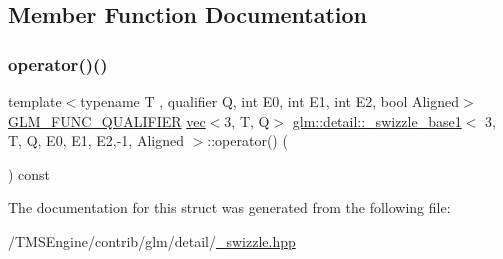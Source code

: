 \subsection{Member Function Documentation}
\mbox{\label{structglm_1_1detail_1_1__swizzle__base1_3_013_00_01_t_00_01_q_00_01_e0_00_01_e1_00_01_e2_00-1_00_01_aligned_01_4_a52562036288d3f7a063c5172f4b572ab}} 
\subsubsection{\texorpdfstring{operator()()}{operator()()}}
{\footnotesize\ttfamily template$<$typename T , qualifier Q, int E0, int E1, int E2, bool Aligned$>$ \\
\hyperlink{setup_8hpp_a33fdea6f91c5f834105f7415e2a64407}{G\+L\+M\+\_\+\+F\+U\+N\+C\+\_\+\+Q\+U\+A\+L\+I\+F\+I\+ER} \hyperlink{structglm_1_1vec}{vec}$<$3, T, Q$>$ \hyperlink{structglm_1_1detail_1_1__swizzle__base1}{glm\+::detail\+::\+\_\+swizzle\+\_\+base1}$<$ 3, T, Q, E0, E1, E2,-\/1, Aligned $>$\+::operator() (\begin{DoxyParamCaption}{ }\end{DoxyParamCaption}) const\hspace{0.3cm}{\ttfamily [inline]}}



The documentation for this struct was generated from the following file\+:\begin{DoxyCompactItemize}
\item 
/\+T\+M\+S\+Engine/contrib/glm/detail/\hyperlink{__swizzle_8hpp}{\+\_\+swizzle.\+hpp}\end{DoxyCompactItemize}
